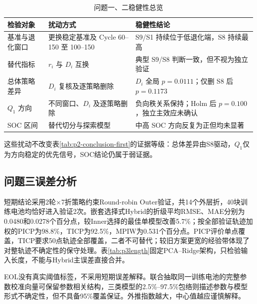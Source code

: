 \documentclass[withoutpreface]{cumcmthesis}
\begin{document}
\begin{table}[htbp]
    \centering
    \caption{问题一、二稳健性总览}
    \label{tab:robustness_summary}
    \small
    \renewcommand{\arraystretch}{1.25}
    \setlength{\tabcolsep}{6pt}

    \begin{tabularx}{\textwidth}{
        >{\raggedright\arraybackslash}p{}
        >{\raggedright\arraybackslash}l
        >{\raggedright\arraybackslash}X
    }
        \toprule
        检验对象 & 扰动方式 & 稳健性结论 \\
        \midrule

        基准与退化窗口
        & 更换稳定基准及 Cycle 60--150 至 100--150
        & S9/S1 持续位于低退化端，S8 持续最高 \\

        替代指标
        & $r_i$ 与 $D_i$ 互换
        & 典型 S9/S8 判断一致，但不视为独立验证 \\

        总体策略差异
        & $D_i$ 复核及逐策略删除
        & $D_i$ 全局 $p=0.0111$；仅删 S8 后 $p=0.1173$ \\

        $Q_1$ 方向
        & 不同窗口、$D_i$ 及逐策略删除
        & 负向秩关系保持；Holm 后 $p=0.100$，独立主效应未确认 \\

        SOC 区间
        & 替代切分与探索模型
        & 中高 SOC 方向反复为正但均未显著 \\

        \bottomrule
    \end{tabularx}
\end{table}
这些扰动不改变表\ref{tab:p2-conclusion-first}的证据等级：总体差异由S8驱动，$Q_1$仅为方向稳定的优先信号，SOC结论仍属于弱证据。

\subsection{问题三误差分析}
短期结论采用2轮$\times$7折策略约束Round-robin Outer验证，共14个外层折，40块训练电池均恰好进入验证2次。嵌套选择式Hybrid的折级平均RMSE、MAE分别为0.0480和0.0278个百分点，较Inner选择的最佳单模型改善5.7\%；按全部验证轨迹加权的PICP为98.8\%，TICP为92.5\%，MPIW为0.531个百分点。PICP评价单点覆盖，TICP要求50点轨迹全部覆盖，二者不可替代；较旧方案更宽的经验带体现了对整轨迹不确定性的保守处理。表\ref{tab:p3length}固定PCA--Ridge架构，只检验输入长度，不能与Hybrid主误差直接合并。

EOL没有真实阈值标签，不采用短期误差解释。联合抽取同一训练电池的完整参数校准向量可保留参数相关结构，三类模型的2.5\%--97.5\%包络则描述参数与模型形式不确定性，但不具备95\%覆盖保证。外推指数越大，中心值越应谨慎解释。
\end{document}
